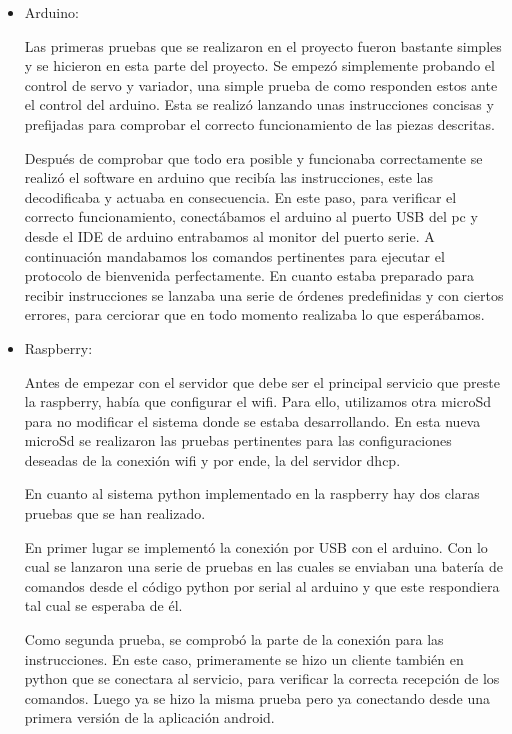 \documentclass{pclass}
\begin{document}
\begin{itemize}
	\item Arduino:
	
		Las primeras pruebas que se realizaron en el proyecto fueron bastante simples y se hicieron en esta parte del proyecto. Se empezó simplemente probando el control de servo y variador, una simple prueba de como responden estos ante el control del arduino. Esta se realizó lanzando unas instrucciones concisas y prefijadas para comprobar el correcto funcionamiento de las piezas descritas.
		
		Después de comprobar que todo era posible y funcionaba correctamente se realizó el software en arduino que recibía las instrucciones, este las decodificaba y actuaba en consecuencia. En este paso, para verificar el correcto funcionamiento, conectábamos el arduino al puerto USB del pc y desde el IDE de arduino entrabamos al monitor del puerto serie. A continuación mandabamos los comandos pertinentes para ejecutar el protocolo de bienvenida perfectamente. En cuanto estaba preparado para recibir instrucciones se lanzaba una serie de órdenes predefinidas y con ciertos errores, para cerciorar que en todo momento realizaba lo que esperábamos. 
		
	\item Raspberry:
	
		Antes de empezar con el servidor que debe ser el principal servicio que preste la raspberry, había que configurar el wifi. Para ello, utilizamos otra microSd para no modificar el sistema donde se estaba desarrollando. En esta nueva microSd se realizaron las pruebas pertinentes para las configuraciones deseadas de la conexión wifi y por ende, la del servidor dhcp.
	
		En cuanto al sistema python implementado en la raspberry hay dos claras pruebas que se han realizado.
		
		En primer lugar se implementó la conexión por USB con el arduino. Con lo cual se lanzaron una serie de pruebas en las cuales se enviaban una batería de comandos desde el código python por serial al arduino y que este respondiera tal cual se esperaba de él.
		
		Como segunda prueba, se comprobó la parte de la conexión para las instrucciones. En este caso, primeramente se hizo un cliente también en python que se conectara al servicio, para verificar la correcta recepción de los comandos. Luego ya se hizo la misma prueba pero ya conectando desde una primera versión de la aplicación android.
		

\end{itemize}
\end{document}
